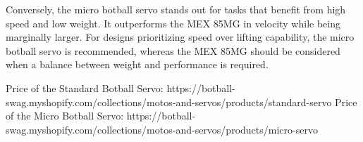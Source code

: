 \documentclass[conference]{IEEEtran}
\begin{document}
Conversely, the micro botball servo stands out for tasks that benefit from high speed and low weight. It outperforms the MEX 85MG in velocity while being marginally larger. For designs prioritizing speed over lifting capability, the micro botball servo is recommended, whereas the MEX 85MG should be considered when a balance between weight and performance is required.

\begin{thebibliography}{00}

 Price of the Standard Botball Servo: https://botball-swag.myshopify.com/collections/motos-and-servos/products/standard-servo
 Price of the Micro Botball Servo: https://botball-swag.myshopify.com/collections/motos-and-servos/products/micro-servo

\end{thebibliography}
\end{document}
